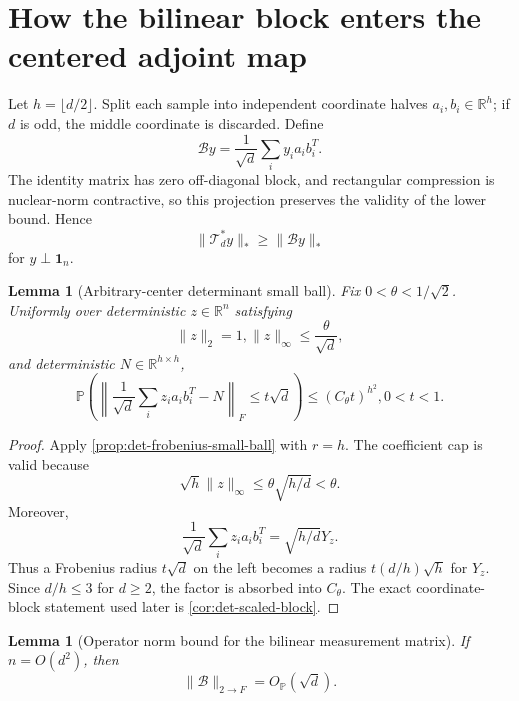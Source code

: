 \documentclass[11pt]{article}
\numberwithin{equation}{section}
\newtheorem{lemma}[theorem]{Lemma}
\theoremstyle{definition}
\theoremstyle{remark}
\newcommand{\Pp}{\mathbb P}
\newcommand{\1}{\boldsymbol 1}
\begin{document}
\section{How the bilinear block enters the centered
  adjoint map}\label{off-diagonal-small-balls-and-product-state-continuity}

\begin{aiblock}
 
Let $h=\lfloor d/2\rfloor$. Split each sample into
independent coordinate halves $a_i,b_i\in\mathbb R^h$; if $d$
is odd, the middle coordinate is discarded. Define
\[
  \mathcal{B}y=\frac1{\sqrt d}\sum_i y_i a_ib_i^T.
\]
The identity matrix has zero off-diagonal block, and
rectangular compression is nuclear-norm contractive, so
this projection preserves the validity of the lower bound.
Hence
\[
  \|\mathcal{T}_d^*y\|_*\ge\|\mathcal{B}y\|_*
\]
for $y\perp\1_n$.

\begin{lemma}[Arbitrary-center determinant small
  ball]\label{main-lemma-4-1}
  Fix $0<\theta<1/\sqrt2$. Uniformly over deterministic
  $z\in\mathbb R^n$ satisfying
  \[
    \|z\|_2=1, \|z\|_\infty\le\frac\theta{\sqrt d},
  \]
  and deterministic $N\in\mathbb R^{h\times h}$,
  \[
    \Pp\left(\left\|\frac1{\sqrt d}\sum_i z_i
    a_ib_i^T-N\right\|_F\le t\sqrt d\right)
    \le(C_\theta t)^{h^2}, 0<t<1.
  \]
\end{lemma}

\begin{proof}
  Apply \cref{prop:det-frobenius-small-ball} with
  $r=h$. The coefficient cap is valid because
  \[
    \sqrt h\|z\|_\infty\le\theta\sqrt{h/d}<\theta.
  \]
  Moreover,
  \[
    \frac1{\sqrt d}\sum_i z_ia_ib_i^T=\sqrt{h/d}Y_z.
  \]
  Thus a Frobenius radius $t\sqrt d$ on the left becomes
  a radius $t(d/h)\sqrt h$ for $Y_z$. Since $d/h\le3$ for
  $d\ge2$, the factor is absorbed into $C_\theta$. The
  exact coordinate-block statement used later is
  \cref{cor:det-scaled-block}.
\end{proof}

\begin{lemma}[Operator norm bound for the bilinear
  measurement matrix]\label{main-lemma-4-2}
  If $n=O(d^2)$, then
  \[
    \|\mathcal{B}\|_{2\mathbin{\to}F}=O_{\Pp}(\sqrt d).
  \]
\end{lemma}


\end{aiblock}
\end{document}
